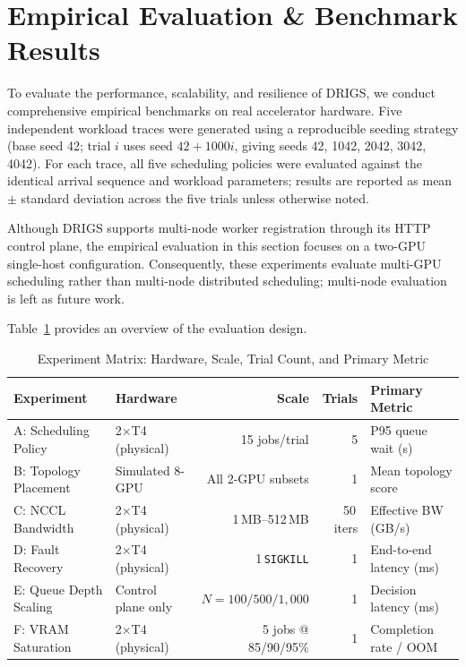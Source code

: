 \section{Empirical Evaluation \& Benchmark Results}
\label{sec:evaluation}

To evaluate the performance, scalability, and resilience of DRIGS, we conduct comprehensive empirical benchmarks on real accelerator hardware. Five independent workload traces were generated using a reproducible seeding strategy (base seed 42; trial $i$ uses seed $42 + 1000i$, giving seeds 42, 1042, 2042, 3042, 4042). For each trace, all five scheduling policies were evaluated against the identical arrival sequence and workload parameters; results are reported as mean $\pm$ standard deviation across the five trials unless otherwise noted.

Although DRIGS supports multi-node worker registration through its HTTP control plane, the empirical evaluation in this section focuses on a two-GPU single-host configuration. Consequently, these experiments evaluate multi-GPU scheduling rather than multi-node distributed scheduling; multi-node evaluation is left as future work.

Table~\ref{tab:experiment_matrix} provides an overview of the evaluation design.

\begin{table}[htbp]
\centering
\caption{Experiment Matrix: Hardware, Scale, Trial Count, and Primary Metric}
\label{tab:experiment_matrix}
\begin{tabular}{llrrl}
\toprule
\textbf{Experiment} & \textbf{Hardware} & \textbf{Scale} & \textbf{Trials} & \textbf{Primary Metric} \\
\midrule
A: Scheduling Policy   & 2$\times$T4 (physical) & 15 jobs/trial & 5 & P95 queue wait (s) \\
B: Topology Placement  & Simulated 8-GPU        & All 2-GPU subsets & 1 & Mean topology score \\
C: NCCL Bandwidth      & 2$\times$T4 (physical) & 1\,MB--512\,MB    & 50\,iters & Effective BW (GB/s) \\
D: Fault Recovery      & 2$\times$T4 (physical) & 1\,\texttt{SIGKILL} & 1 & End-to-end latency (ms) \\
E: Queue Depth Scaling & Control plane only     & $N=100/500/1{,}000$ & 1 & Decision latency (ms) \\
F: VRAM Saturation     & 2$\times$T4 (physical) & 5 jobs @ 85/90/95\% & 1 & Completion rate / OOM \\
\bottomrule
\end{tabular}
\end{table}


